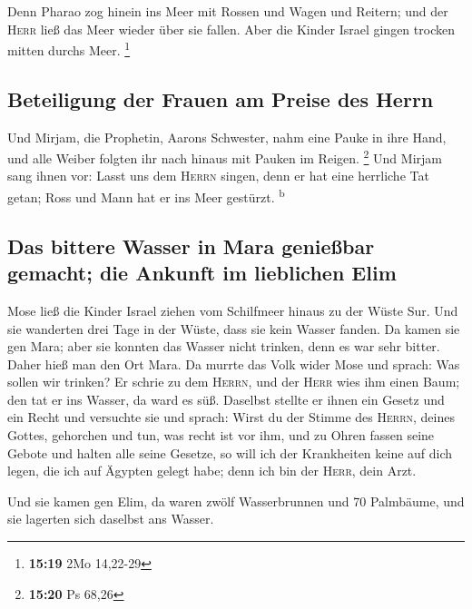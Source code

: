  Denn Pharao zog hinein ins Meer mit Rossen und Wagen und
Reitern; und der \textsc{Herr} ließ das Meer wieder über sie fallen.
Aber die Kinder Israel gingen trocken mitten durchs Meer. \footnote{\textbf{15:19}
  2Mo 14,22-29}

\hypertarget{beteiligung-der-frauen-am-preise-des-herrn}{%
\subsection{Beteiligung der Frauen am Preise des
Herrn}\label{beteiligung-der-frauen-am-preise-des-herrn}}

 Und Mirjam, die Prophetin, Aarons Schwester, nahm eine
Pauke in ihre Hand, und alle Weiber folgten ihr nach hinaus mit Pauken
im Reigen. \footnote{\textbf{15:20} Ps 68,26}  Und Mirjam
sang ihnen vor: Lasst uns dem \textsc{Herrn} singen, denn er hat eine
herrliche Tat getan; Ross und Mann hat er ins Meer gestürzt.
\textsuperscript{b}

\hypertarget{das-bittere-wasser-in-mara-genieuxdfbar-gemacht-die-ankunft-im-lieblichen-elim}{%
\subsection{Das bittere Wasser in Mara genießbar gemacht; die Ankunft im
lieblichen
Elim}\label{das-bittere-wasser-in-mara-genieuxdfbar-gemacht-die-ankunft-im-lieblichen-elim}}

 Mose ließ die Kinder Israel ziehen vom Schilfmeer hinaus
zu der Wüste Sur. Und sie wanderten drei Tage in der Wüste, dass sie
kein Wasser fanden.  Da kamen sie gen Mara; aber sie
konnten das Wasser nicht trinken, denn es war sehr bitter. Daher hieß
man den Ort Mara.  Da murrte das Volk wider Mose und
sprach: Was sollen wir trinken?  Er schrie zu dem
\textsc{Herrn}, und der \textsc{Herr} wies ihm einen Baum; den tat er
ins Wasser, da ward es süß. Daselbst stellte er ihnen ein Gesetz und ein
Recht und versuchte sie  und sprach: Wirst du der Stimme
des \textsc{Herrn}, deines Gottes, gehorchen und tun, was recht ist vor
ihm, und zu Ohren fassen seine Gebote und halten alle seine Gesetze, so
will ich der Krankheiten keine auf dich legen, die ich auf Ägypten
gelegt habe; denn ich bin der \textsc{Herr}, dein Arzt.

 Und sie kamen gen Elim, da waren zwölf Wasserbrunnen und
70 Palmbäume, und sie lagerten sich daselbst ans Wasser.

